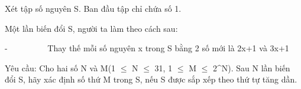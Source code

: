 Xét tập số nguyên S. Ban đầu tập chỉ chứa số 1.  

   Một lần biến đổi S, người ta làm theo cách sau:  

   -          Thay thế mỗi số nguyên x trong S bằng 2 số mới là 2x+1 và 3x+1  

   Yêu cầu: Cho hai số N và M(1 $\le$ N $\le$ 31, 1 $\le$ M $\le$ 2^N). Sau N lần biến đổi S, hãy xác định số thứ M trong S, nếu S được sắp xếp theo thứ tự tăng dần.  

\